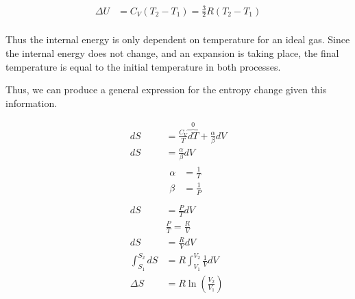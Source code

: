 \begin{enumerate}
\begin{enumerate}[(a)]
{          \begin{align*}
            \Delta U &= C_V(T_2 - T_1) = \frac{3}{2}R(T_2 - T_1) \tag{4.62} \\
          \end{align*}

          Thus the internal energy is only dependent on temperature
          for an ideal gas. Since the internal energy does not
          change, and an expansion is taking place, the final
          temperature is equal to the initial temperature in both processes.

          Thus, we can produce a general expression for the entropy
          change given this information.

          \begin{align*}
            dS &= \frac{C_V}{T}\overbrace{dT}^0 + \frac{\alpha}{\beta}dV \\
            dS &=  \frac{\alpha}{\beta}dV \\
            &
            \begin{aligned}
              \alpha &= \frac{1}{T} \\
              \beta &= \frac{1}{P} \\
            \end{aligned}\tag{4.57-4.58} \\
            dS &=  \frac{P}{T}dV \\
            & \frac{P}{T} = \frac{R}{V} \\
            dS &= \frac{R}{V}dV  \\
            \int_{S_1}^{S_2} dS &= R\int_{V_1}^{V_2} \frac{1}{V}dV  \\
            \Delta S &= R\ln\left(\frac{V_2}{V_1}\right)
            \tag{1}\label{eq:entropy} \\
          \end{align*}

        }

        \pagebreak


\end{enumerate}
\end{enumerate}
